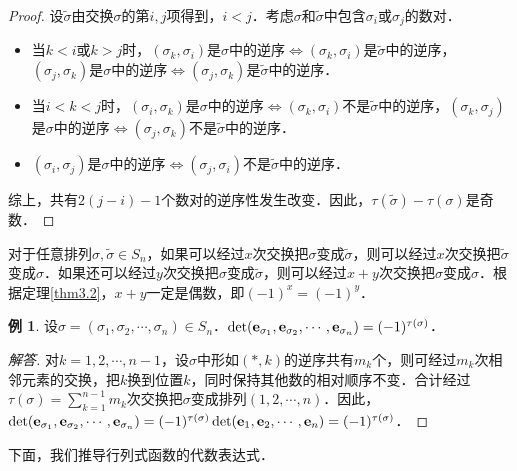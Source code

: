 \documentclass[a4paper,fontset=windows]{ctexbook}
\theoremstyle{definition}
\newtheorem{example}{例}[chapter]
\begin{document}
\begin{proof}
设$\widetilde{\sigma}$由交换$\sigma$的第$i,j$项得到，$i<j$．考虑$\sigma$和$\widetilde{\sigma}$中包含$\sigma_i$或$\sigma_j$的数对．
\begin{itemize}
\item 当$k<i$或$k>j$时，$(\sigma_k,\sigma_i)$是$\sigma$中的逆序$\Leftrightarrow(\sigma_k,\sigma_i)$是$\widetilde{\sigma}$中的逆序，$(\sigma_j,\sigma_k)$是$\sigma$中的逆序$\Leftrightarrow(\sigma_j,\sigma_k)$是$\widetilde{\sigma}$中的逆序．
\item 当$i<k<j$时，$(\sigma_i,\sigma_k)$是$\sigma$中的逆序$\Leftrightarrow(\sigma_k,\sigma_i)$不是$\widetilde{\sigma}$中的逆序，$(\sigma_k,\sigma_j)$是$\sigma$中的逆序$\Leftrightarrow(\sigma_j,\sigma_k)$不是$\widetilde{\sigma}$中的逆序．
\item $(\sigma_i,\sigma_j)$是$\sigma$中的逆序$\Leftrightarrow(\sigma_j,\sigma_i)$不是$\widetilde{\sigma}$中的逆序．
\end{itemize}
综上，共有$2(j-i)-1$个数对的逆序性发生改变．因此，$\tau(\widetilde{\sigma})-\tau(\sigma)$是奇数．
\end{proof}

对于任意排列$\sigma,\widetilde{\sigma}\in S_n$，如果可以经过$x$次交换把$\sigma$变成$\widetilde{\sigma}$，则可以经过$x$次交换把$\widetilde{\sigma}$变成$\sigma$．如果还可以经过$y$次交换把$\sigma$变成$\widetilde{\sigma}$，则可以经过$x+y$次交换把$\sigma$变成$\sigma$．根据定理\ref{thm3.2}，$x+y$一定是偶数，即$(-1)^x=(-1)^y$．

\begin{example}
设$\sigma=(\sigma_1,\sigma_2,\cdots,\sigma_n)\in S_n$．$\det({\bf e}_{\sigma_1},{\bf e}_{\sigma_2},\cdots,{\bf e}_{\sigma_n})=(-1)^{\tau(\sigma)}$．
\end{example}

\begin{proof}[解答]
对$k=1,2,\cdots,n-1$，设$\sigma$中形如$(*,k)$的逆序共有$m_k$个，则可经过$m_k$次相邻元素的交换，把$k$换到位置$k$，同时保持其他数的相对顺序不变．合计经过$\tau(\sigma)=\sum\limits_{k=1}^{n-1}m_k$次交换把$\sigma$变成排列$(1,2,\cdots,n)$．因此，$\det({\bf e}_{\sigma_1},{\bf e}_{\sigma_2},\cdots,{\bf e}_{\sigma_n})=(-1)^{\tau(\sigma)}\det({\bf e}_1,{\bf e}_2,\cdots,{\bf e}_n)=(-1)^{\tau(\sigma)}$．
\end{proof}

下面，我们推导行列式函数的代数表达式．
\end{document}
